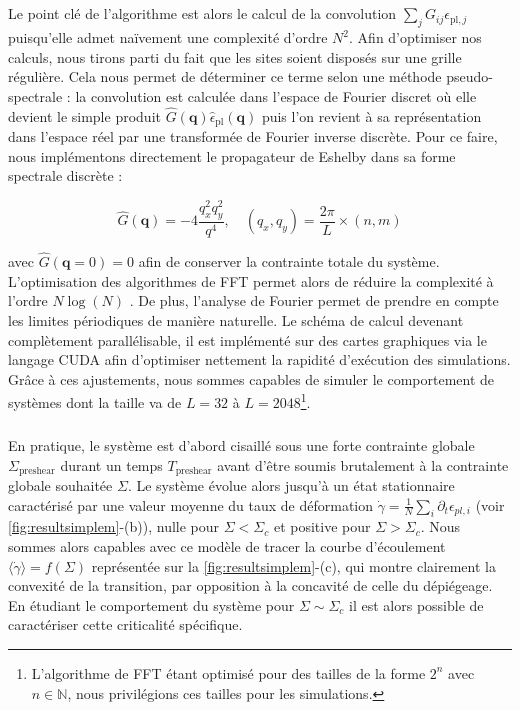 \subparagraph{}Le point clé de l'algorithme est alors le calcul de la convolution $\sum_{j}G_{ij}\epsilon_{\text{pl},j}$ puisqu'elle admet naïvement une complexité d'ordre $N^2$. Afin d'optimiser nos calculs, nous tirons parti du fait que les sites soient disposés sur une grille régulière. Cela nous permet de déterminer ce terme selon une méthode pseudo-spectrale : la convolution est calculée dans l'espace de Fourier discret où elle devient le simple produit $\hat{G}(\mathbf{q})\hat{\epsilon}_{\text{pl}}(\mathbf{q})$ puis l'on revient à sa représentation dans l'espace réel par une transformée de Fourier inverse discrète. Pour ce faire, nous implémentons directement le propagateur de Eshelby dans sa forme spectrale discrète \cite{picard_elastic_2004} :

\begin{equation}
	\hat{G}(\mathbf{q}) = -4\frac{q_x^2 q_y^2}{q^4}, \quad (q_x, q_y) = \frac{2\pi}{L} \times (n,m)
	\label{eq:eshelbydiscretfourier}
\end{equation}

\noindent avec $\hat{G}(\mathbf{q}=0) = 0$ afin de conserver la contrainte totale du système. L'optimisation des algorithmes de FFT permet alors de réduire la complexité à l'ordre $N\log(N)$ \cite{cooley_algorithm_1965}. De plus, l'analyse de Fourier permet de prendre en compte les limites périodiques de manière naturelle. Le schéma de calcul devenant complètement parallélisable, il est implémenté sur des cartes graphiques via le langage CUDA \cite{cuda} afin d'optimiser nettement la rapidité d'exécution des simulations. Grâce à ces ajustements, nous sommes capables de simuler le comportement de systèmes dont la taille va de $L=32$ à $L=2048$\footnote{L'algorithme de FFT étant optimisé pour des tailles de la forme $2^n$ avec $n\in\mathbb{N}$, nous privilégions ces tailles pour les simulations.}.

\subparagraph{}En pratique, le système est d'abord cisaillé sous une forte contrainte globale $\Sigma_\text{preshear}$ durant un temps $T_\text{preshear}$ avant d'être soumis brutalement à la contrainte globale souhaitée $\Sigma$. Le système évolue alors jusqu'à un état stationnaire caractérisé par une valeur moyenne du taux de déformation $ \dot{\gamma}  = \frac{1}{N}\sum_{i}\partial_t\epsilon_{pl,i}$ (voir \autoref{fig:resultsimplem}-(b)), nulle pour $\Sigma<\Sigma_c$ et positive pour $\Sigma>\Sigma_c$. Nous sommes alors capables avec ce modèle de tracer la courbe d'écoulement $\langle \dot{\gamma} \rangle = f(\Sigma)$ représentée sur la \autoref{fig:resultsimplem}-(c), qui montre clairement la convexité de la transition, par opposition à la concavité de celle du dépiégeage. En étudiant le comportement du système pour $\Sigma \sim \Sigma_c$ il est alors possible de caractériser cette criticalité spécifique.

